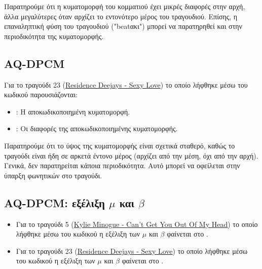     Παρατηρούμε ότι η κυματομορφή του κομματιού έχει μικρές διαφορές στην αρχή, άλλα μεγαλύτερες όταν αρχίζει το εντονότερο μέρος του τραγουδιού.
    Επίσης, η επαναληπτική φύση του τραγουδιού ("beatακι") μπορεί να παρατηρηθεί και στην περιοδικότητα της κυματομορφής.
\FloatBarrier
\subsection{AQ-DPCM}\label{sub:aq}
    Για το τραγούδι 23 (\href{https://www.youtube.com/watch?v=tuXOTlYOSEA}{Residence Deejays - Sexy Love}) το οποίο λήφθηκε μέσω του κωδικού \Acode{} παρουσιάζονται:
    \begin{itemize}
    \item {}:
    Η αποκωδικοποιημένη κυματομορφή.
    \item {}:
    Οι διαφορές της αποκωδικοποιημένης κυματομορφής.
    \end{itemize}

    Παρατηρούμε ότι το ύψος της κυματομορφής είναι σχετικά σταθερό, καθώς το τραγούδι είναι ήδη σε αρκετά έντονο μέρος (αρχίζει από την μέση, όχι από την αρχή).
    Γενικά, δεν παρατηρείται κάποια περιοδικότητα.
    Αυτό μπορεί να οφείλεται στην ύπαρξη φωνητικών στο τραγούδι.
\subsection[AQ-DPCM: εξέλιξη \emph{μ} και \emph{β}]{AQ-DPCM: εξέλιξη $\mu$ και $\beta$}\label{sub:aq-m-b}
    \begin{itemize}
    \item Για το τραγούδι 5 (\href{https://www.youtube.com/watch?v=YPwtJ89jes4}{Kylie Minogue - Can't Get You Out Of My Head})
    το οποίο λήφθηκε μέσω του κωδικού \Acode{}
    η εξέλιξη των $\mu$ και $\beta$ φαίνεται στο
    .
    \item Για το τραγούδι 23 (\href{https://www.youtube.com/watch?v=tuXOTlYOSEA}{Residence Deejays - Sexy Love})
    το οποίο λήφθηκε μέσω του κωδικού \Acodesecond{}
    η εξέλιξη των $\mu$ και $\beta$ φαίνεται στο
    .
    \end{itemize}

\FloatBarrier
